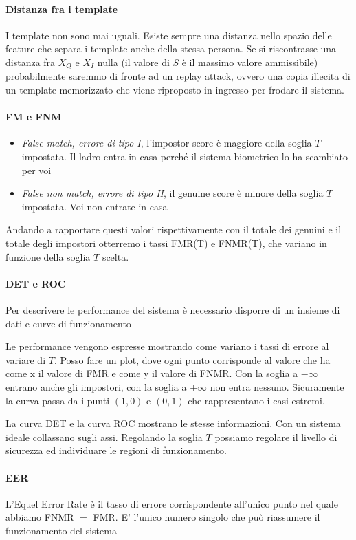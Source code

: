 \paragraph{Distanza fra i template}
I template non sono mai uguali. Esiste sempre una distanza nello spazio delle feature che separa i template anche della stessa persona. Se si riscontrasse una distanza fra $X_Q$ e $X_I$ nulla (il valore di $S$ è il massimo valore ammissibile) probabilmente saremmo di fronte ad un replay attack, ovvero una copia illecita di un template memorizzato che viene riproposto in ingresso per frodare il sistema.

\paragraph{FM e FNM}
\begin{itemize}
    \item \textit{False match, errore di tipo I}, l'impostor score è maggiore della soglia $T$ impostata. Il ladro entra in casa perché il sistema biometrico lo ha scambiato per voi
    \item \textit{False non match, errore di tipo II}, il genuine score è minore della soglia $T$ impostata. Voi non entrate in casa
\end{itemize}
Andando a rapportare questi valori rispettivamente con il totale dei genuini e il totale degli impostori otterremo i tassi FMR(T) e FNMR(T), che variano in funzione della soglia $T$ scelta.

\paragraph{DET e ROC}
Per descrivere le performance del sistema è necessario disporre di un insieme di dati e curve di funzionamento

Le performance vengono espresse mostrando come variano i tassi di errore al variare di $T$. Posso fare un plot, dove ogni punto corrisponde al valore che ha come x il valore di FMR e come y il valore di FNMR. Con la soglia a $-\infty$ entrano anche gli impostori, con la soglia a $+\infty$ non entra nessuno. Sicuramente la curva passa da i punti $(1,0)\text{ e }(0,1)$ che rappresentano i casi estremi.

La curva DET e la curva ROC mostrano le stesse informazioni. Con un sistema ideale collassano sugli assi. Regolando la soglia $T$ possiamo regolare il livello di sicurezza ed individuare le regioni di funzionamento.

\paragraph{EER}
L’Equel Error Rate è il tasso di errore corrispondente all’unico punto nel quale abbiamo FNMR $=$ FMR. E' l’unico numero singolo che può riassumere il funzionamento del sistema

